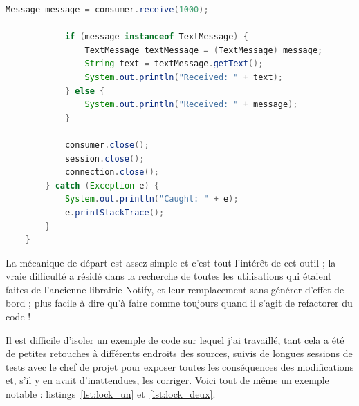 \begin{minipage}{\linewidth}
\begin{lstlisting}[language=Java, caption="Un exemple écourté d'échange de messages \textit{via} ActiveMQ", label={lst:activemqex}]
            Message message = consumer.receive(1000);

            if (message instanceof TextMessage) {
                TextMessage textMessage = (TextMessage) message;
                String text = textMessage.getText();
                System.out.println("Received: " + text);
            } else {
                System.out.println("Received: " + message);
            }

            consumer.close();
            session.close();
            connection.close();
        } catch (Exception e) {
            System.out.println("Caught: " + e);
            e.printStackTrace();
        }
    }
\end{lstlisting}
\end{minipage}

La mécanique de départ est assez simple et c'est tout l'intérêt de cet outil ; la vraie difficulté a résidé dans la recherche de toutes les utilisations qui étaient faites de l'ancienne librairie Notify, et leur remplacement sans générer d'effet de bord ; plus facile à dire qu'à faire comme toujours quand il s'agit de refactorer du code !

Il est difficile d'isoler un exemple de code sur lequel j'ai travaillé, tant cela a été de petites retouches à différents endroits des sources, suivis de longues sessions de tests avec le chef de projet pour exposer toutes les conséquences des modifications et, s'il y en avait d'inattendues, les corriger. Voici tout de même un exemple notable : listings~\ref{lst:lock_un} et~\ref{lst:lock_deux}.

